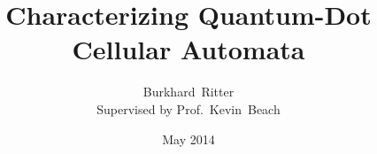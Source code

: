 \documentclass[11pt]{book}
\begin{document}
\graphicspath{}

\title{Characterizing Quantum-Dot Cellular Automata}
\author{Burkhard~Ritter\\Supervised by Prof.~Kevin~Beach}
\date{May 2014}
\maketitle

\tableofcontents


\newcommand{\ket}[1]{\left|#1\right>}
\newcommand{\bra}[1]{\left<#1\right|}

%




{}

\end{document}
